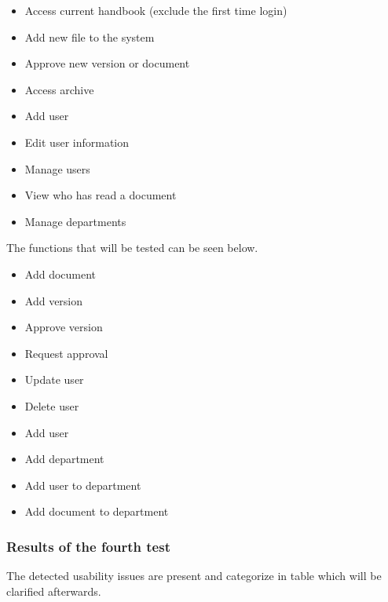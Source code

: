 \begin{itemize}
	\item Access current handbook (exclude the first time login)
	\item Add new file to the system
	\item Approve new version or document
	\item Access archive
	\item Add user
	\item Edit user information
	\item Manage users
	\item View who has read a document
	\item Manage departments
\end{itemize}

The functions that will be tested can be seen below.

\begin{itemize}
	\item Add document
	\item Add version
	\item Approve version
	\item Request approval
	\item Update user
	\item Delete user
	\item Add user
	\item Add department
	\item Add user to department
	\item Add document to department
\end{itemize}

\subsubsection*{Results of the fourth test}
The detected usability issues are present and categorize in table
 which will be clarified afterwards.

